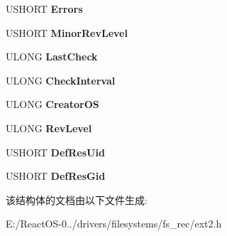 \begin{DoxyCompactItemize}
\mbox{\label{struct___e_x_t2___s_u_p_e_r___b_l_o_c_k_acd86de5a3893f945fdc4c86f07a6de21}} 
U\+S\+H\+O\+RT {\bfseries Errors}
\item 
\mbox{\label{struct___e_x_t2___s_u_p_e_r___b_l_o_c_k_accc2b8e41b9a8a2e5bbb522c13198745}} 
U\+S\+H\+O\+RT {\bfseries Minor\+Rev\+Level}
\item 
\mbox{\label{struct___e_x_t2___s_u_p_e_r___b_l_o_c_k_a7ed18dbbe0e46aacf26683c47d3f2725}} 
U\+L\+O\+NG {\bfseries Last\+Check}
\item 
\mbox{\label{struct___e_x_t2___s_u_p_e_r___b_l_o_c_k_a0127c82db59f512f8cf4db5e8eb9bdf6}} 
U\+L\+O\+NG {\bfseries Check\+Interval}
\item 
\mbox{\label{struct___e_x_t2___s_u_p_e_r___b_l_o_c_k_ad928c1f4ac8b23cbd262555c85a280ed}} 
U\+L\+O\+NG {\bfseries Creator\+OS}
\item 
\mbox{\label{struct___e_x_t2___s_u_p_e_r___b_l_o_c_k_a8e93908f3e31973f9400cc32a233b721}} 
U\+L\+O\+NG {\bfseries Rev\+Level}
\item 
\mbox{\label{struct___e_x_t2___s_u_p_e_r___b_l_o_c_k_af234d007d33c3b1ec207cb11e52bbfcb}} 
U\+S\+H\+O\+RT {\bfseries Def\+Res\+Uid}
\item 
\mbox{\label{struct___e_x_t2___s_u_p_e_r___b_l_o_c_k_ab96f8328d0bac4e32d87e43aed6ba473}} 
U\+S\+H\+O\+RT {\bfseries Def\+Res\+Gid}
\end{DoxyCompactItemize}


该结构体的文档由以下文件生成\+:\begin{DoxyCompactItemize}
\item 
E\+:/\+React\+O\+S-\/0../drivers/filesystems/fs\+\_\+rec/ext2.\+h\end{DoxyCompactItemize}

